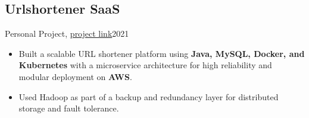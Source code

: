 \subsection{Urlshortener SaaS}{Personal Project, \href{https://github.com/Danial-Kord/Cloud-Computing-Project.git}{project link}}{2021}
\begin{itemize}
    \item Built a scalable URL shortener platform using \textbf{Java, MySQL, Docker, and Kubernetes} with a microservice architecture for high reliability and modular deployment on \textbf{AWS}.
    \item Used Hadoop as part of a backup and redundancy layer for distributed storage and fault tolerance.
\end{itemize}
